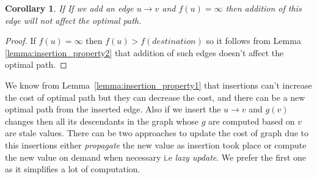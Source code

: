 \documentclass[a4paper]{article}
\newtheorem{corollary}{Corollary}[theorem]
\begin{document}
\begin{corollary}\label{corollary:insertion_property2}
If If we add an edge $u \rightarrow v$ and $f(u) = \infty$ then addition of this edge will not affect the optimal path.
\end{corollary}
\begin{proof}
 If $f(u) = \infty$ then $f(u) > f(destination)$ so it follows from Lemma \ref{lemma:insertion_property2} that addition of such edges doesn't affect the optimal path.
\end{proof}
We know from Lemma~\ref{lemma:insertion_property1} that insertions can't increase the cost of optimal path but they can decrease the cost, and there can be a new optimal path from the inserted edge. Also if we insert the $u \rightarrow v$ and $g(v)$ changes then all its descendants in the graph whose $g$ are computed based on $v$ are stale values. There can be two approaches to update the cost of graph due to this insertions either \textit{propagate} the new value as insertion took place or compute the new value on demand when necessary i.e \textit{lazy update}. We prefer the first one as it simplifies a lot of computation.
\end{document}
